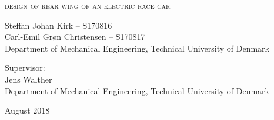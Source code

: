 \begin{titlingpage}

\begin{center}

\vspace*{0cm}
\HUGE
\textsc{design of rear wing of an electric race car}\\
\vspace{1.5cm}

%
\vspace{1.2cm}

\large
{
  Steffan Johan Kirk -- S170816\\
    Carl-Emil Grøn Christensen -- S170817\\
    Department of Mechanical Engineering, Technical University of Denmark
}
\vspace{1.5cm}

{
  Supervisor:\\
  Jens Walther\\
  Department of Mechanical Engineering, Technical University of Denmark
}

\vspace{1.5cm}
{August 2018}\\


\end{center}



\end{titlingpage}
